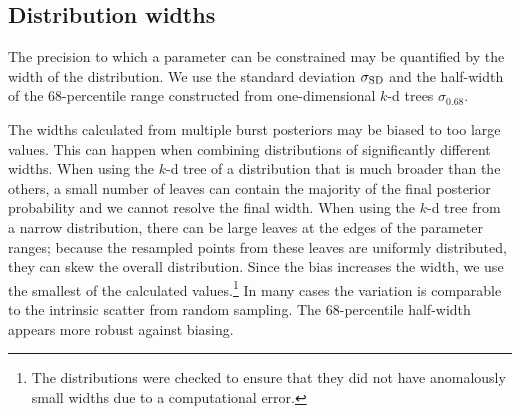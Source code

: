 \subsection{Distribution widths}

The precision to which a parameter can be constrained may be quantified by the width of the distribution. We use the standard deviation $\sigma_\mathrm{SD}$ and the half-width of the $68$-percentile range constructed from one-dimensional $k$-d trees $\sigma_{0.68}$.

The widths calculated from multiple burst posteriors may be biased to too large values. This can happen when combining distributions of significantly different widths. When using the $k$-d tree of a distribution that is much broader than the others, a small number of leaves can contain the majority of the final posterior probability and we cannot resolve the final width. When using the $k$-d tree from a narrow distribution, there can be large leaves at the edges of the parameter ranges; because the resampled points from these leaves are uniformly distributed, they can skew the overall distribution. Since the bias increases the width, we use the smallest of the calculated values.\footnote{The distributions were checked to ensure that they did not have anomalously small widths due to a computational error.}
In many cases the variation is comparable to the intrinsic scatter from random sampling. The $68$-percentile half-width appears more robust against biasing.


